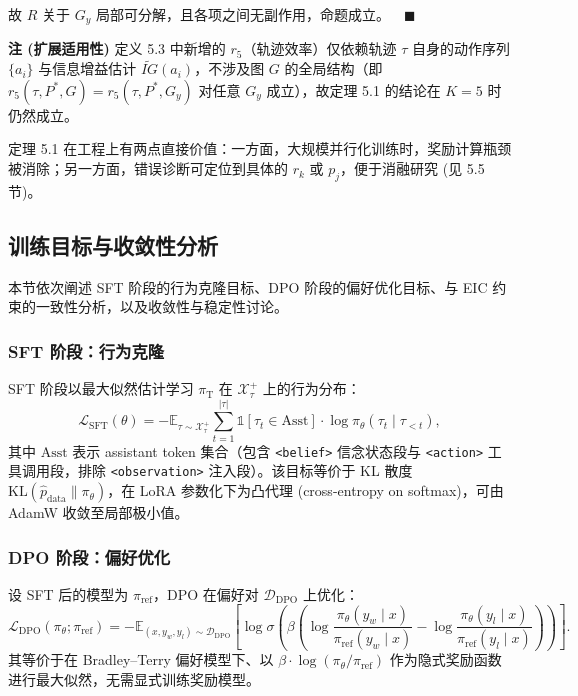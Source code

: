 \documentclass[a4paper,12pt]{ctexart}
\begin{document}
故 $R$ 关于 $G_y$ 局部可分解，且各项之间无副作用，命题成立。$\quad\blacksquare$

\textbf{注 (扩展适用性)} 定义 5.3 中新增的 $r_5$（轨迹效率）仅依赖轨迹 $\tau$ 自身的动作序列 $\{a_i\}$ 与信息增益估计 $\widetilde{IG}(a_i)$，不涉及图 $G$ 的全局结构（即 $r_5(\tau,P^*,G)=r_5(\tau,P^*,G_y)$ 对任意 $G_y$ 成立），故定理 5.1 的结论在 $K=5$ 时仍然成立。

定理 5.1 在工程上有两点直接价值：一方面，大规模并行化训练时，奖励计算瓶颈被消除；另一方面，错误诊断可定位到具体的 $r_k$ 或 $p_j$，便于消融研究 (见 5.5 节)。

\subsection{训练目标与收敛性分析}

本节依次阐述 SFT 阶段的行为克隆目标、DPO 阶段的偏好优化目标、与 EIC 约束的一致性分析，以及收敛性与稳定性讨论。

\subsubsection{SFT 阶段：行为克隆}

SFT 阶段以最大似然估计学习 $\pi_\mathrm{T}$ 在 $\mathcal{X}_\tau^+$ 上的行为分布：
\[\mathcal{L}_{\mathrm{SFT}}(\theta)=-\mathbb{E}_{\tau\sim \mathcal{X}_\tau^+}\sum_{t=1}^{|\tau|}\mathbb{1}[\tau_t\in\mathrm{Asst}]\cdot \log \pi_\theta(\tau_t\mid \tau_{<t}),\]
其中 $\mathrm{Asst}$ 表示 assistant token 集合（包含 \texttt{<belief>} 信念状态段与 \texttt{<action>} 工具调用段，排除 \texttt{<observation>} 注入段）。该目标等价于 KL 散度 $\mathrm{KL}(\hat p_{\mathrm{data}}\|\pi_\theta)$，在 LoRA 参数化下为凸代理 (cross-entropy on softmax)，可由 AdamW 收敛至局部极小值。

\subsubsection{DPO 阶段：偏好优化}

设 SFT 后的模型为 $\pi_{\mathrm{ref}}$，DPO 在偏好对 $\mathcal{D}_{\mathrm{DPO}}$ 上优化：
\[\mathcal{L}_{\mathrm{DPO}}(\pi_\theta;\pi_{\mathrm{ref}})=-\mathbb{E}_{(x,y_w,y_l)\sim \mathcal{D}_{\mathrm{DPO}}}\!\left[\log \sigma\!\left(\beta\!\left(\log\frac{\pi_\theta(y_w\mid x)}{\pi_{\mathrm{ref}}(y_w\mid x)}-\log\frac{\pi_\theta(y_l\mid x)}{\pi_{\mathrm{ref}}(y_l\mid x)}\right)\right)\right].\]
其等价于在 Bradley–Terry 偏好模型下、以 $\beta\cdot\log(\pi_\theta/\pi_{\mathrm{ref}})$ 作为隐式奖励函数进行最大似然，无需显式训练奖励模型。
\end{document}
